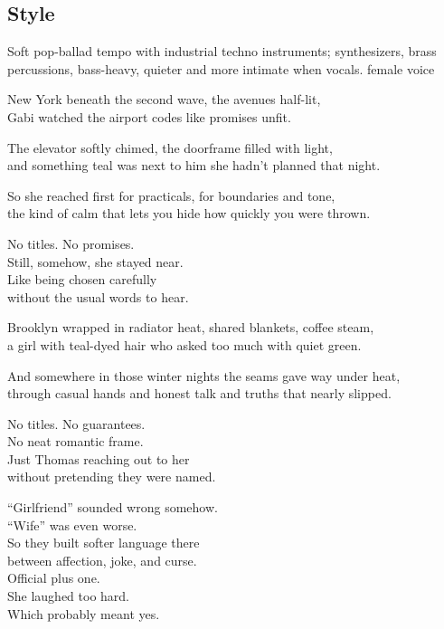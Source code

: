 \subsection{Style}
Soft pop-ballad tempo with industrial techno instruments; synthesizers, brass percussions, bass-heavy, quieter and more intimate when vocals. female voice

\begin{lyrics}

New York beneath the second wave, the avenues half-lit,\\
Gabi watched the airport codes like promises unfit.

The elevator softly chimed, the doorframe filled with light,\\
and something teal was next to him she hadn’t planned that night.

So she reached first for practicals, for boundaries and tone,\\
the kind of calm that lets you hide how quickly you were thrown.

No titles. No promises.\\
Still, somehow, she stayed near.\\
Like being chosen carefully\\
without the usual words to hear.

Brooklyn wrapped in radiator heat, shared blankets, coffee steam,\\
a girl with teal-dyed hair who asked too much with quiet green.

And somewhere in those winter nights the seams gave way under heat,\\
through casual hands and honest talk and truths that nearly slipped.

No titles. No guarantees.\\
No neat romantic frame.\\
Just Thomas reaching out to her\\
without pretending they were named.

“Girlfriend” sounded wrong somehow.\\
“Wife” was even worse.\\
So they built softer language there\\
between affection, joke, and curse.\\
Official plus one.\\
She laughed too hard.\\
Which probably meant yes.


\end{lyrics}
